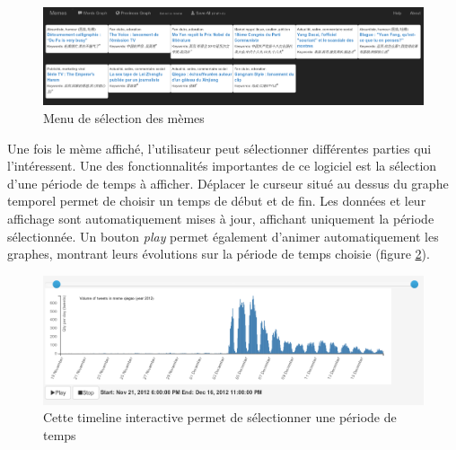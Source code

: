     \begin{figure}[htpb]
        \centering
        \includegraphics[scale=0.3]{figures/chap4/ui/ui-menu.png}
        \caption{Menu de sélection des mèmes}
        \label{fig:ui-menu}
    \end{figure}

    Une fois le mème affiché, l'utilisateur peut sélectionner différentes parties qui l'intéressent. Une des fonctionnalités importantes de ce logiciel est la sélection d'une période de temps à afficher. Déplacer le curseur situé au dessus du graphe temporel permet de choisir un temps de début et de fin. Les données et leur affichage sont automatiquement mises à jour, affichant uniquement la période sélectionnée. Un bouton \textit{play} permet également d'animer automatiquement les graphes, montrant leurs évolutions sur la période de temps choisie (figure \ref{fig:ui-timeline}).

    \begin{figure}[htpb]
        \centering
        \includegraphics[scale=0.4]{figures/chap4/ui/ui-timeline.png}
        \caption{Cette timeline interactive permet de sélectionner une période de temps}
        \label{fig:ui-timeline}
    \end{figure}

